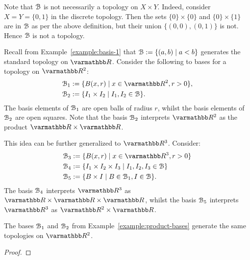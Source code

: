 \begin{remark}
    Note that $\mathcal{B}$ is not necessarily a topology on $X \times Y$. Indeed, 
    consider $X = Y = \{0,1\}$ in the discrete topology. Then the sets $\{0\}\times\{0\}$ and $\{0\}\times\{1\}$ are in $\mathcal{B}$ as per the above definition, but their union $\{(0,0),(0,1)\}$ is not. Hence $\mathcal{B}$ is not a topology.
\end{remark}

\begin{example}\label{example:product-bases}
    Recall from Example~\ref{example:basis-1} that $\mathcal{B} := \{(a,b) \mid a < b\}$ generates the standard topology on $\bfR$. Consider the following to bases for a topology on $\bfR^2$:
        \begin{equation*}
        \begin{split}
            \cB_1 &:= \{B(x,r) \mid x \in \bfR^2, r > 0\}, \\
            \cB_2 &:= \{I_1 \times I_2 \mid I_1, I_2 \in \cB\}.
        \end{split}
        \end{equation*}
    The basis elements of $\mathcal{B}_1$ are open balls of radius $r$, whilst the basis elements of $\mathcal{B}_2$ are open squares. Note that the basis $\mathcal{B}_2$ interprets $\bfR^2$ as the product $\bfR \times \bfR$.

    This idea can be further generalized to $\bfR^3$. Consider:
        \begin{equation*}
        \begin{split}
            \cB_3 &:= \{B(x,r) \mid x \in \bfR^3 , r > 0\} \\
            \cB_4 &:= \{I_1 \times I_2 \times I_3 \mid I_1,I_2,I_3 \in \cB\} \\
            \cB_5 &:= \{ B \times I \mid B \in \cB_1, I \in \cB\}.
        \end{split}
        \end{equation*}
    The basis $\mathcal{B}_4$ interprets $\bfR^3$ as $\bfR \times \bfR \times \bfR$, whilst the basis $\mathcal{B}_5$ interprets $\bfR^3$ as $\bfR^2 \times \bfR$.
\end{example}

\begin{proposition}
    The bases $\mathcal{B}_1$ and $\mathcal{B}_2$ from Example~\ref{example:product-bases} generate the same topologies on $\bfR^2$.
\end{proposition}
    {\color{red} \begin{proof}
        
    \end{proof}}

